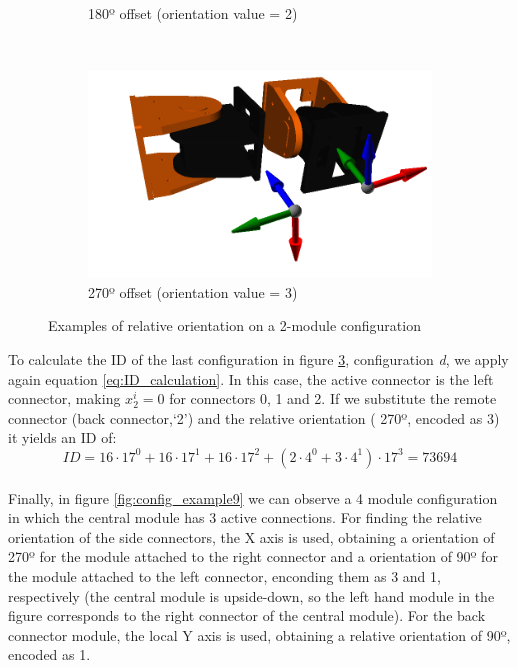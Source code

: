 \begin{figure}[h]
\begin{subfigure}[b]{0.35\textwidth}
                \caption{180º offset (orientation value = 2)}
                \label{fig:config_example7}
        \end{subfigure}
                ~
        \begin{subfigure}[b]{0.35\textwidth}
         	   \centering
                \includegraphics[width=\textwidth]{images/Conf_example_05.png}
                \caption{270º offset (orientation value = 3)}
                \label{fig:config_example8}
        \end{subfigure}
        \caption{Examples of relative orientation on a 2-module configuration}\label{fig:config_example5-8}
\end{figure}

To calculate the ID of the last configuration in figure \ref{fig:config_example5-8}, configuration \emph{d}, we apply again equation \ref{eq:ID_calculation}. In this case, the active connector is the left connector, making $x_2^i=0$ for connectors 0, 1 and 2. If we substitute the remote connector (back connector,`2') and the relative orientation ( 270º, encoded as 3) it yields an ID of:
\[ID =16 \cdot 17^0 + 16 \cdot 17^1 + 16 \cdot 17^2 + ( 2 \cdot 4^0+ 3 \cdot 4^1)  \cdot 17^3 = 73694\]\\

Finally, in figure \ref{fig:config_example9} we can observe a 4 module configuration in which the central module has 3 active connections. For finding the relative orientation of the side connectors, the X axis is used, obtaining a orientation of 270º for the module attached to the right connector and a orientation of 90º for the module attached to the left connector, enconding them as 3 and 1, respectively (the central module is upside-down, so the left hand module in the figure corresponds to the right connector of the central module). For the back connector module, the local Y axis is used, obtaining a relative orientation of 90º, encoded as 1.\\

